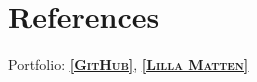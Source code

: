 \documentclass[11pt,a4paper,sans,colorlinks,linkcolor=blue,urlcolor=blue]{moderncv}
\begin{document}
\section{References}
Portfolio: \underline{\href{https://github.com/jacobpihl}{\textbf{\textsc{[GitHub]}}}},
\underline{\href{https://play.google.com/store/apps/details?id=com.PihlApps.LillaMatten}{\textbf{\textsc{[Lilla Matten]}}}}\\

\end{document}
